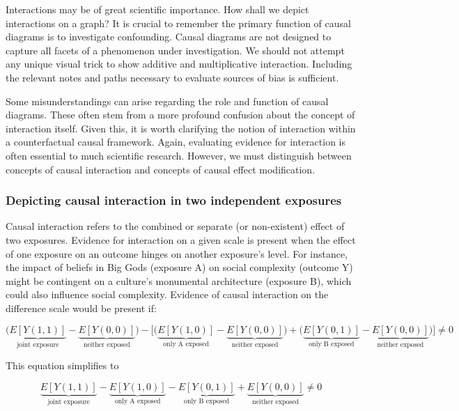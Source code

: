 \documentclass[
  singlecolumn]{report}
\begin{document}
Interactions may be of great scientific importance. How shall we depict
interactions on a graph? It is crucial to remember the primary function
of causal diagrams is to investigate confounding. Causal diagrams are
not designed to capture all facets of a phenomenon under investigation.
We should not attempt any unique visual trick to show additive and
multiplicative interaction. Including the relevant notes and paths
necessary to evaluate sources of bias is sufficient.

Some misunderstandings can arise regarding the role and function of
causal diagrams. These often stem from a more profound confusion about
the concept of interaction itself. Given this, it is worth clarifying
the notion of interaction within a counterfactual causal framework.
Again, evaluating evidence for interaction is often essential to much
scientific research. However, we must distinguish between concepts of
causal interaction and concepts of causal effect modification.

\hypertarget{depicting-causal-interaction-in-two-independent-exposures}{%
\subsubsection{\texorpdfstring{\textbf{Depicting causal interaction in
two independent
exposures}}{Depicting causal interaction in two independent exposures}}\label{depicting-causal-interaction-in-two-independent-exposures}}

Causal interaction refers to the combined or separate (or non-existent)
effect of two exposures. Evidence for interaction on a given scale is
present when the effect of one exposure on an outcome hinges on another
exposure's level. For instance, the impact of beliefs in Big Gods
(exposure A) on social complexity (outcome Y) might be contingent on a
culture's monumental architecture (exposure B), which could also
influence social complexity. Evidence of causal interaction on the
difference scale would be present if:

\[\bigg(\underbrace{E[Y(1,1)]}_{\text{joint exposure}} - \underbrace{E[Y(0,0)]}_{\text{neither exposed}}\bigg) - \bigg[ \bigg(\underbrace{E[Y(1,0)]}_{\text{only A exposed}} - \underbrace{E[Y(0,0)]}_{\text{neither exposed}}\bigg) + \bigg(\underbrace{E[Y(0,1)]}_{\text{only B exposed}} - \underbrace{E[Y(0,0)]}_{\text{neither exposed}} \bigg)\bigg] \neq 0 \]

This equation simplifies to

\[ \underbrace{E[Y(1,1)]}_{\text{joint exposure}} - \underbrace{E[Y(1,0)]}_{\text{only A exposed}} - \underbrace{E[Y(0,1)]}_{\text{only B exposed}} + \underbrace{E[Y(0,0)]}_{\text{neither exposed}} \neq 0 \]
\end{document}
